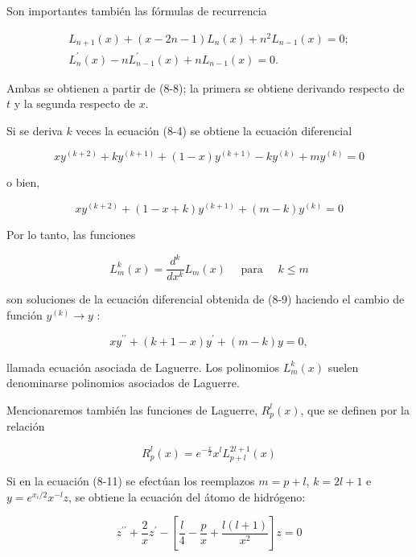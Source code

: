 \documentclass[10pt]{article}
\theoremstyle{plain}
\theoremstyle{definition}
\theoremstyle{remark}
\begin{document}
Son importantes también las fórmulas de recurrencia

$$
\begin{gathered}
L_{n+1}(x)+(x-2 n-1) L_{n}(x)+n^{2} L_{n-1}(x)=0 ; \\
L_{n}^{\prime}(x)-n L_{n-1}^{\prime}(x)+n L_{n-1}(x)=0 .
\end{gathered}
$$

Ambas se obtienen a partir de (8-8); la primera se obtiene derivando respecto de $t$ y la segunda respecto de $x$.

Si se deriva $k$ veces la ecuación (8-4) se obtiene la ecuación diferencial

$$
x y^{(k+2)}+k y^{(k+1)}+(1-x) y^{(k+1)}-k y^{(k)}+m y^{(k)}=0
$$

o bien,


\begin{equation*}
x y^{(k+2)}+(1-x+k) y^{(k+1)}+(m-k) y^{(k)}=0 \tag{8-9}
\end{equation*}


Por lo tanto, las funciones


\begin{equation*}
L_{m}^{k}(x)=\frac{d^{k}}{d x^{k}} L_{m}(x) \quad \text { para } \quad k \leqslant m \tag{8-10}
\end{equation*}


son soluciones de la ecuación diferencial obtenida de (8-9) haciendo el cambio de función $y^{(k)} \rightarrow y$ :


\begin{equation*}
x y^{\prime \prime}+(k+1-x) y^{\prime}+(m-k) y=0, \tag{8-11}
\end{equation*}


llamada ecuación asociada de Laguerre. Los polinomios $L_{m}^{k}(x)$ suelen denominarse polinomios asociados de Laguerre.

Mencionaremos también las funciones de Laguerre, $R_{p}^{l}(x)$, que se definen por la relación


\begin{equation*}
R_{p}^{l}(x)=e^{-\frac{x}{2}} x^{l} L_{p+l}^{2 l+1}(x) \tag{8-12}
\end{equation*}


Si en la ecuación (8-11) se efectúan los reemplazos $m=p+l$, $k=2 l+1$ e $y=e^{x_{i} / 2} x^{-l} z$, se obtiene la ecuación del átomo de hidrógeno:


\begin{equation*}
z^{\prime \prime}+\frac{2}{x} z^{\prime}-\left[\frac{l}{4}-\frac{p}{x}+\frac{l(l+1)}{x^{2}}\right] z=0 \tag{8-13}
\end{equation*}
\end{document}
